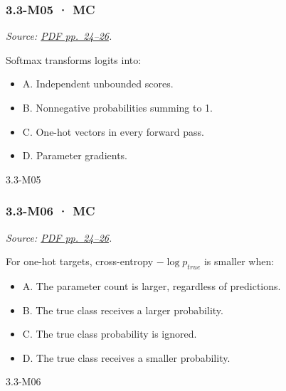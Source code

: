 \noindent\begin{minipage}{\linewidth}

\subsubsection{3.3-M05 · MC}\label{m05-mc-9}

\emph{Source:
\href{../Lecture\%20Slides/3.3.\%20Deep\%20Learning\%20Fundamentals.pdf\#page=24}{PDF
pp.~24--26}.}

Softmax transforms logits into:

\begin{itemize}
\tightlist
\item
  A. Independent unbounded scores.
\item
  B. Nonnegative probabilities summing to 1.
\item
  C. One-hot vectors in every forward pass.
\item
  D. Parameter gradients.
\end{itemize}

\begin{solution}[8mm]{3.3-M05}

\end{solution}
\end{minipage}\par\medskip

\noindent\begin{minipage}{\linewidth}

\subsubsection{3.3-M06 · MC}\label{m06-mc-9}

\emph{Source:
\href{../Lecture\%20Slides/3.3.\%20Deep\%20Learning\%20Fundamentals.pdf\#page=24}{PDF
pp.~24--26}.}

For one-hot targets, cross-entropy \(-\log p_{true}\) is smaller when:

\begin{itemize}
\tightlist
\item
  A. The parameter count is larger, regardless of predictions.
\item
  B. The true class receives a larger probability.
\item
  C. The true class probability is ignored.
\item
  D. The true class receives a smaller probability.
\end{itemize}

\begin{solution}[8mm]{3.3-M06}

\end{solution}
\end{minipage}\par\medskip

